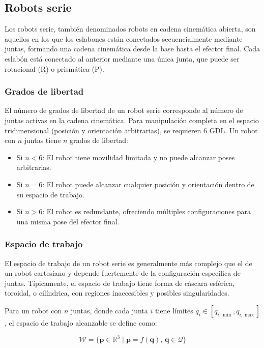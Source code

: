 \subsection{Robots serie}

Los robots serie, también denominados robots en cadena cinemática abierta, son aquellos en los que los eslabones están conectados secuencialmente mediante juntas, formando una cadena cinemática desde la base hasta el efector final. Cada eslabón está conectado al anterior mediante una única junta, que puede ser rotacional (R) o prismática (P).

\subsubsection{Grados de libertad}

El número de grados de libertad de un robot serie corresponde al número de juntas activas en la cadena cinemática. Para manipulación completa en el espacio tridimensional (posición y orientación arbitrarias), se requieren 6 GDL. Un robot con $n$ juntas tiene $n$ grados de libertad:

\begin{itemize}[label=$\bullet$]
    \item Si $n < 6$: El robot tiene movilidad limitada y no puede alcanzar poses arbitrarias.
    \item Si $n = 6$: El robot puede alcanzar cualquier posición y orientación dentro de su espacio de trabajo.
    \item Si $n > 6$: El robot es redundante, ofreciendo múltiples configuraciones para una misma pose del efector final.
\end{itemize}

\subsubsection{Espacio de trabajo}

El espacio de trabajo de un robot serie es generalmente más complejo que el de un robot cartesiano y depende fuertemente de la configuración específica de juntas. Típicamente, el espacio de trabajo tiene forma de cáscara esférica, toroidal, o cilíndrica, con regiones inaccesibles y posibles singularidades.

Para un robot con $n$ juntas, donde cada junta $i$ tiene límites $q_i \in [q_{i,\min}, q_{i,\max}]$, el espacio de trabajo alcanzable se define como:

\begin{equation}
\mathcal{W} = \{\mathbf{p} \in \mathbb{R}^3 \mid \mathbf{p} = f(\mathbf{q}), \, \mathbf{q} \in \mathcal{Q}\}
\end{equation}

